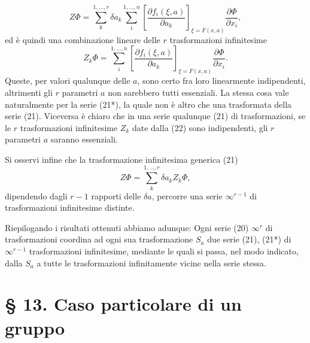 \documentclass[11pt]{book}
\begin{document}
\[
 Z\Phi=\sum\limits_k^{1,\ldots,r}\delta a_k\sum\limits_i^{1,\ldots,n}\left[\frac{\partial f_i(\xi,a)}{\partial a_k}\right]_{\xi=F(x,a)}\frac{\partial\Phi}{\partial x_i},
\]
ed è quindi una combinazione lineare delle $r$ trasformazioni infinitesime
\begin{equation*}\tag{22}
 Z_k\Phi=\sum\limits_i^{1,\ldots,n}\left[\frac{\partial f_i(\xi,a)}{\partial a_k}\right]_{\xi=F(x,a)}\frac{\partial\Phi}{\partial x_i}.
\end{equation*}
Queste, per valori qualunque delle $a$, sono certo fra loro linearmente indipendenti, altrimenti gli $r$ parametri $a$ non sarebbero tutti essenziali. La stessa cosa vale naturalmente per la serie (21*), la quale non è altro che una trasformata della serie (21). Viceversa è chiaro che in una serie qualunque (21) di trasformazioni, se le $r$ trasformazioni infinitesime $Z_k$ date dalla (22) sono indipendenti, gli $r$ parametri $a$ saranno essenziali.

Si osservi infine che la trasformazione infinitesima generica (21)
\[
 Z\Phi=\sum\limits_k^{1,\ldots,r}\delta a_k Z_k\Phi,
\]
dipendendo dagli $r-1$ rapporti delle $\delta a$, percorre una serie $\infty^{r-1}$ di trasformazioni infinitesime distinte.

Riepilogando i risultati ottenuti abbiamo adunque:
Ogni serie (20) $\infty^r$ di trasformazioni coordina ad ogni sua trasformazione $S_a$ due serie (21), (21*) di $\infty^{r-1}$ trasformazioni infinitesime, mediante le quali si passa, nel modo indicato, dalla $S_a$ a tutte le trasformazioni infinitamente vicine nella serie stessa.


\section*{\S{} 13. Caso particolare di un gruppo}
\end{document}
